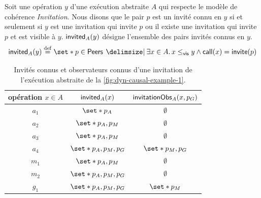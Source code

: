 \begin{definition}\label{def:known-invited}
Soit une opération $y$ d'une exécution abstraite $A$ qui respecte le modèle de cohérence \emph{Invitation}.
Nous disons que le pair $p$ est un invité connu en $y$ si et seulement si $y$ est une invitation qui invite $p$ ou il existe une invitation qui invite $p$ et est visible à $y$.
$\operatorname{\mathsf{invited}}_A(y)$ désigne l'ensemble des pairs invités connus en $y$.
\begin{equation*}
    \trm{invited}_A(y) \defeq \set*{p \in \trm{Peers} \given \exists x \in A \qsep x \viseq y \land \trm{call}(x) = \trm{invite}(p)}
\end{equation*}
\end{definition}


\begin{table}[htb]
    \centering
    \begin{tabular}{ccc}
        opération $x \in A$ & $\operatorname{\mathsf{invited}}_A(x)$ & $\operatorname{\mathsf{invitationObs}}_A(x,p_G)$ \\
        \toprule
        $a_1$ & $\set*{p_A}$ & $\emptyset$ \\
        $a_2$ & $\set*{p_A, p_M}$ & $\emptyset$ \\
        $a_3$ & $\set*{p_A, p_M}$ & $\emptyset$ \\
        $a_4$ & $\set*{p_A, p_M,p_G}$ & $\set*{p_M,p_G}$\\
        $m_1$ & $\set*{p_A, p_M}$ & $\emptyset$ \\
        $m_2$ & $\set*{p_A, p_M,p_G}$ & $\emptyset$ \\
        $g_1$ & $\set*{p_A, p_M,p_G}$ & $\set*{p_M}$ \\
    \end{tabular}
    \caption[Invités connus et observateurs connus d'une invitation]{Invités connus et observateurs connus d'une invitation de l'exécution abstraite de la \autoref{fig:dyn-causal-example-1}.}\label{tab:invited}
\end{table}

